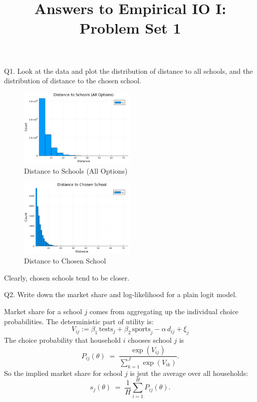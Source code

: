 \documentclass{article}
\begin{document}
\title{Answers to Empirical IO I: Problem Set 1}
\author{}
\date{}
\maketitle

\begin{tcolorbox}
Q1. Look at the data and plot the distribution of distance to all schools, and the distribution of distance to the chosen school.
\end{tcolorbox}

\begin{figure}[H]
    \centering
    \includegraphics[width=0.5\textwidth]{outputs/Q1_dist_all.png}
    \caption{Distance to Schools (All Options)}
\end{figure}

\begin{figure}[H]
    \centering
    \includegraphics[width=0.5\textwidth]{outputs/Q1_dist_chosen.png}
    \caption{Distance to Chosen School}
\end{figure}

\vspace{5mm}

Clearly, chosen schools tend to be closer.
\begin{tcolorbox}
Q2. Write down the market share and log-likelihood for a plain logit model.
\end{tcolorbox}

Market share for a school $j$ comes from aggregating up the individual choice probabilities. The deterministic part of utility is:
\[
V_{ij} := \beta_1 \,\text{tests}_j + \beta_2 \,\text{sports}_j - \alpha \, d_{ij} + \xi_j
\]
The choice probability that household $i$ chooses school $j$ is
\[
P_{ij}(\theta) \;=\; \frac{\exp(V_{ij})}{\sum_{k=1}^J \exp(V_{ik})}.
\]
So the implied market share for school $j$ is jsut the average over all households:
\[
s_j(\theta) \;=\; \frac{1}{H} \sum_{i=1}^H P_{ij}(\theta).
\]
\end{document}

